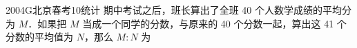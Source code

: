 
\begin{problem}{2004}{G}{北京春考}{10}{统计}
期中考试之后，班长算出了全班 40 个人数学成绩的平均分为 $M$．如果把 $M$ 当成一个同学的分数，与原来的 40 个分数一起，算出这 41 个分数的平均值为 $N$，那么 $M:N$ 为
\begin{choices}
\end{choices}
\end{problem}